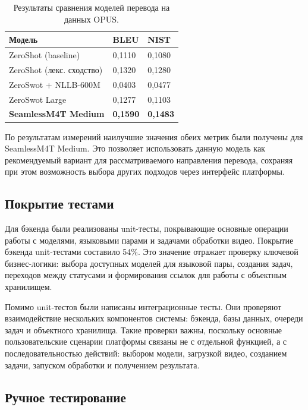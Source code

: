 \documentclass[a4paper,article,14pt]{extarticle}
\begin{document}
\begin{center}
\begin{longtable}{|p{6cm}|p{3cm}|p{3cm}|}
\caption{Результаты сравнения моделей перевода на данных OPUS.}\\
\hline
Модель & BLEU & NIST\\
\hline
ZeroShot (baseline) & 0{,}1110 & 0{,}1080\\
\hline
ZeroShot (лекс. сходство) & 0{,}1320 & 0{,}1280\\
\hline
ZeroSwot + NLLB-600M & 0{,}0403 & 0{,}0477\\
\hline
ZeroSwot Large & 0{,}1277 & 0{,}1103\\
\hline
\textbf{SeamlessM4T Medium} & \textbf{0{,}1590} & \textbf{0{,}1483}\\
\hline
\end{longtable}
\end{center}

По результатам измерений наилучшие значения обеих метрик были получены для SeamlessM4T Medium. Это позволяет использовать данную модель как рекомендуемый вариант для рассматриваемого направления перевода, сохраняя при этом возможность выбора других подходов через интерфейс платформы.

\subsection{Покрытие тестами}

Для бэкенда были реализованы unit-тесты, покрывающие основные операции работы с моделями, языковыми парами и задачами обработки видео. Покрытие бэкенда unit-тестами составило 54\%. Это значение отражает проверку ключевой бизнес-логики: выбора доступных моделей для языковой пары, создания задач, переходов между статусами и формирования ссылок для работы с объектным хранилищем.

Помимо unit-тестов были написаны интеграционные тесты. Они проверяют взаимодействие нескольких компонентов системы: бэкенда, базы данных, очереди задач и объектного хранилища. Такие проверки важны, поскольку основные пользовательские сценарии платформы связаны не с отдельной функцией, а с последовательностью действий: выбором модели, загрузкой видео, созданием задачи, запуском обработки и получением результата.

\subsection{Ручное тестирование}
\end{document}
